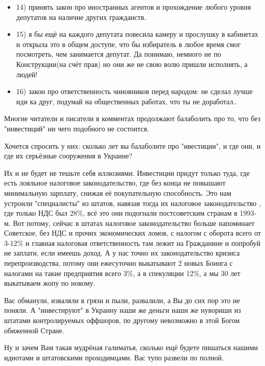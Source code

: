 \begin{itemize}
\begin{itemize}
\item 14) принять закон про иностранных агентов и прохождение любого уровня
				депутатов на наличие других гражданств.

\item 15) я бы ещё на каждого депутата повесила камеру и прослушку в кабинетах и
открыла это в общем доступе, что бы избиратель в любое время смог посмотреть, чем
занимается депутат. Да понимаю, немного не по Конструкции(на счёт прав) но они
же не свою волю пришли исполнять, а людей!

\item 16) закон про ответственность чиновников перед народом: не сделал лучше иди ка
друг, подумай на общественных работах, что ты не доработал..
\end{itemize}


Многие читатели и писатели в комментах продолжают балаболить про то, что без
"инвестиций" ни чего подобного не состоится.

Хочется спросить у них: сколько лет вы балаболите про "ивестиции", и где они, и
где их серьёзные сооружения в Украине?

Их и не будет не тешьте себя иллюзиями. Инвестиции придут только туда, где есть
лояльное налоговое законодательство, где без конца не повышают минимальную
зарплату, снижая её покупательную способность. Это нам устроили "специалисты"
из штатов, навязав тогда их налоговое законодательство , где только НДС был
28\%, всё это они подогнали постсоветским странам в 1993-м. Вот потому, сейчас в
штатах налоговое законодательство больше напоминает Советское, без НДС и прочих
экономических ломов, с налогом с оборота всего от 3-12\% и главная налоговая
ответственность там лежит на Гражданине и попробуй не заплати, если имеешь
доход. А у нас точно их законодательство кризиса перепроизводства, потому они
ежесуточно выкатывают 2 новых Боинга с налогами на такие предприятия всего 3\%,
а в спекуляции 12\%, а мы 30 лет выкатываем жопу по новому.

Вас обманули, изваляли в грязи и пыли, развалили, а Вы до сих пор это не
поняли. А "инвестируют" в Украину наши же деньги наши же нувориши из штатами
контролируемых оффшоров, по другому невозможно в этой Богом обиженной Стране.

Ну и зачем Вам такая мудрёная галиматья, сколько ещё будете пишаться нашими
идиотами и штатовскими проходимцами. Вас тупо развели по полной.


\end{itemize}
